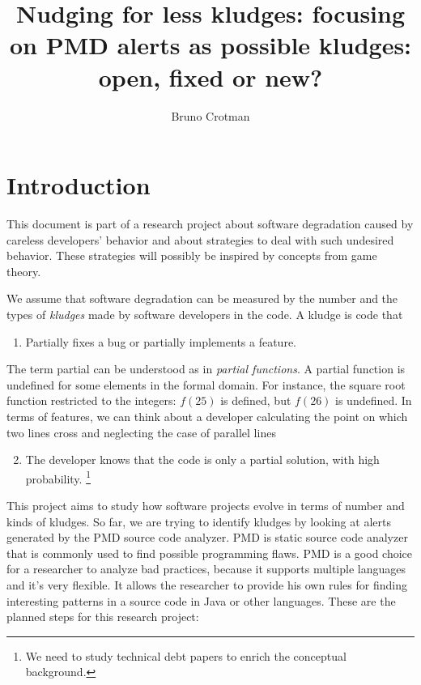 \documentclass[
]{article}
\title{Nudging for less kludges: focusing on PMD alerts as possible kludges:
open, fixed or new?}
\author{Bruno Crotman}
\date{}
\providecommand{\tightlist}{%
  \setlength{\itemsep}{0pt}\setlength{\parskip}{0pt}}
\begin{document}
\maketitle

{
\setcounter{tocdepth}{2}
\tableofcontents
}
\small

\normalsize

\section{Introduction}\label{intro}

This document is part of a research project about software degradation
caused by careless developers' behavior and about strategies to deal
with such undesired behavior. These strategies will possibly be inspired
by concepts from game theory.

We assume that software degradation can be measured by the number and
the types of \textit{kludges} made by software developers in the code. A
kludge is code that

\begin{enumerate}
\def\labelenumi{\arabic{enumi}.}
\tightlist
\item
  Partially fixes a bug or partially implements a feature.
\end{enumerate}

\setlength{\parindent}{1.2cm}
\hangindent=1.2cm

The term partial can be understood as in \textit{partial functions}. A
partial function is undefined for some elements in the formal domain.
For instance, the square root function restricted to the integers:
\(f(25)\) is defined, but \(f(26)\) is undefined. In terms of features,
we can think about a developer calculating the point on which two lines
cross and neglecting the case of parallel lines

\begin{enumerate}
\setcounter{enumi}{1}
\tightlist
\item
  The developer knows that the code is only a partial solution, with
  high probability. \footnote{We need to study technical debt papers
  to enrich the conceptual background.}
\end{enumerate}

This project aims to study how software projects evolve in terms of
number and kinds of kludges. So far, we are trying to identify kludges
by looking at alerts generated by the PMD source code analyzer. PMD is
static source code analyzer that is commonly used to find possible
programming flaws. PMD is a good choice for a researcher to analyze bad
practices, because it supports multiple languages and it's very
flexible. It allows the researcher to provide his own rules for finding
interesting patterns in a source code in Java or other languages. These
are the planned steps for this research project:
\end{document}
